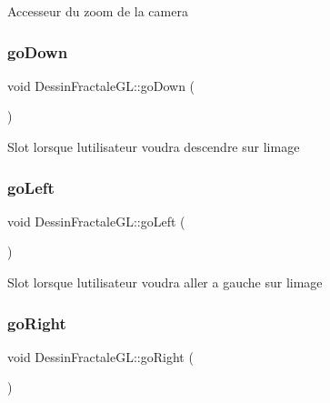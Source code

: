Accesseur du zoom de la camera \mbox{\label{classDessinFractaleGL_a429ba25774e220a73e18b60a807a0f98}} 
\subsubsection{\texorpdfstring{go\+Down}{goDown}}
{\footnotesize\ttfamily void Dessin\+Fractale\+G\+L\+::go\+Down (\begin{DoxyParamCaption}{ }\end{DoxyParamCaption})\hspace{0.3cm}{\ttfamily [slot]}}

Slot lorsque l\textquotesingle{}utilisateur voudra descendre sur l\textquotesingle{}image \mbox{\label{classDessinFractaleGL_ac4ac5c40ce706f55629c8b60f23b4082}} 
\subsubsection{\texorpdfstring{go\+Left}{goLeft}}
{\footnotesize\ttfamily void Dessin\+Fractale\+G\+L\+::go\+Left (\begin{DoxyParamCaption}{ }\end{DoxyParamCaption})\hspace{0.3cm}{\ttfamily [slot]}}

Slot lorsque l\textquotesingle{}utilisateur voudra aller a gauche sur l\textquotesingle{}image \mbox{\label{classDessinFractaleGL_a1be6d62d662d8321fd652a1524eaaffd}} 
\subsubsection{\texorpdfstring{go\+Right}{goRight}}
{\footnotesize\ttfamily void Dessin\+Fractale\+G\+L\+::go\+Right (\begin{DoxyParamCaption}{ }\end{DoxyParamCaption})\hspace{0.3cm}{\ttfamily [slot]}}

